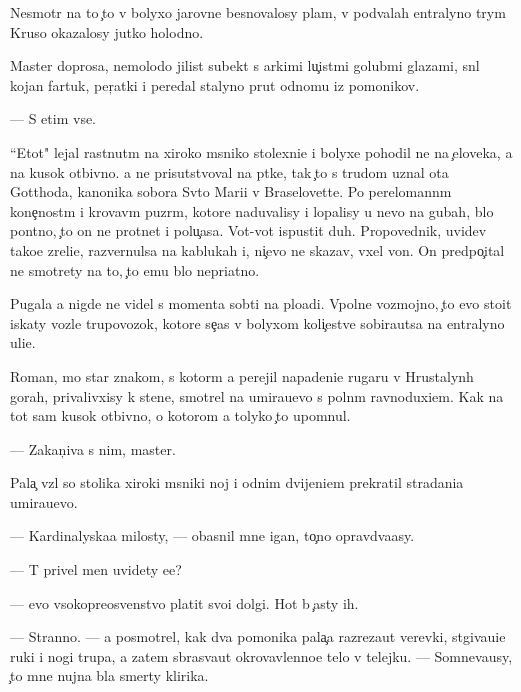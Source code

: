 \documentclass[10pt]{book}
\begin{document}
Nesmotr{\ia} na to {\c}to v bolyxo{\y} jarovne besnovalosy plam{\ia}, v podvalah {\q}entralyno{\y} t{\iu}rym{\yi} Kruso okazalosy jutko holodno.

Master doprosa, nemolodo{\y} jilist{\yi}{\y} sub{\y}ekt s {\y}arkimi lu{\c}ist{\yi}mi golub{\yi}mi glazami, sn{\ia}l kojan{\yi}{\y} fartuk, per{\c}atki i peredal stalyno{\y} prut odnomu iz pomo{\x}nikov.

— S etim vse.

``Etot" lejal rast{\ia}nut{\yi}m na xiroko{\y} m{\ia}sni{\q}ko{\y} stolexni{\q}e i bolyxe pohodil ne na {\c}eloveka, a na kusok otbivno{\y}. {\Y}a ne prisutstvoval na p{\yi}tke, tak {\c}to s trudom uznal ot{\q}a Gotthoda, kanonika sobora Sv{\ia}to{\y} Mari{\y}i v Braselovette. Po perelomann{\yi}m kone{\c}nost{\ia}m i krovav{\yi}m puz{\yi}r{\ia}m, kotor{\yi}{\y}e naduvalisy i lopalisy u nevo na gubah, b{\yi}lo pon{\ia}tno, {\c}to on ne prot{\ia}net i polu{\c}asa. Vot-vot ispustit duh. Propovednik, uvidev tako{\y}e zreli{\x}e, razvernulsa na kablukah i, ni{\c}evo ne skazav, v{\yi}xel von. On predpo{\c}ital ne smotrety na to, {\c}to {\y}emu b{\yi}lo nepri{\y}atno.

Pugala {\y}a nigde ne videl s momenta sob{\yi}ti{\y} na plo{\x}adi. Vpolne vozmojno, {\c}to {\y}evo sto{\y}it iskaty vozle trupovozok, kotor{\yi}{\y}e se{\y}{\c}as v bolyxom koli{\c}estve sobira{\y}utsa na {\q}entralyno{\y} uli{\q}e.

Roman, mo{\y} star{\yi}{\y} znakom{\yi}{\y}, s kotor{\yi}m {\y}a perejil napadeni{\y}e rugaru v Hrustalyn{\yi}h gorah, privalivxisy k stene, smotrel na umira{\y}u{\x}evo s poln{\yi}m ravnoduxi{\y}em. Kak na tot sam{\yi}{\y} kusok otbivno{\y}, o kotorom {\y}a tolyko {\c}to upom{\ia}nul.

— Zakan{\c}iva{\y} s nim, master.

Pala{\c} vz{\ia}l so stolika xiroki{\y} m{\ia}sni{\q}ki{\y} noj i odnim dvijeni{\y}em prekratil stradani{\y}a umira{\y}u{\x}evo.

— Kardinalyska{\y}a milosty, — ob{\y}asnil mne {\q}igan, to{\c}no opravd{\yi}va{\y}asy.

— T{\yi} privel men{\ia} uvidety {\y}e{\y}e?

— {\Y}evo v{\yi}sokopreosv{\ia}{\x}enstvo platit svo{\y}i dolgi. Hot{\ia} b{\yi} {\c}asty ih.

— Stranno. — {\Y}a posmotrel, kak dva pomo{\x}nika pala{\c}a razreza{\y}ut verevki, st{\ia}giva{\y}u{\x}i{\y}e ruki i nogi trupa, a zatem sbras{\yi}va{\y}ut okrovavlenno{\y}e telo v telejku. — Somneva{\y}usy, {\c}to mne nujna b{\yi}la smerty klirika.
\end{document}
